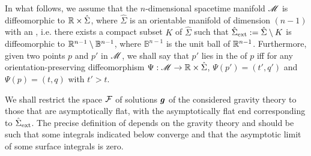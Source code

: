 \begin{prop}
\label{p:tha:asymp_flat_sol}
In what follows, we assume that the $n$-dimensional spacetime manifold $\mathscr{M}$ is diffeomorphic to $\mathbb{R}\times\hat{\Sigma}$,
where $\hat{\Sigma}$ is an orientable manifold of dimension $(n-1)$ with an
,
i.e. there exists a compact subset $K$ of $\hat{\Sigma}$ such that
$\hat{\Sigma}_{\rm ext} := \hat{\Sigma}\setminus K$
is diffeomorphic to $\mathbb{R}^{n-1} \setminus \mathbb{B}^{n-1}$, where $\mathbb{B}^{n-1}$ is the unit ball of
$\mathbb{R}^{n-1}$. Furthermore,
given two points $p$ and $p'$ in $\mathscr{M}$, we shall say that $p'$ lies in the
 of $p$ iff for any orientation-preserving diffeomorphism $\Psi: \mathscr{M} \to \mathbb{R}\times \hat{\Sigma}$,
$\Psi(p') = (t', q')$ and $\Psi(p) = (t, q)$ with $t'>t$.

We shall restrict the space $\mathcal{F}$ of solutions $\bm{g}$ of the considered gravity theory
to those that are asymptotically flat, with the asymptotically flat end corresponding to
$\hat{\Sigma}_{\rm ext}$. The precise definition of  depends on the gravity theory
and should be such that some integrals indicated below converge and that
the asymptotic limit of some surface integrals is zero.
\end{prop}

